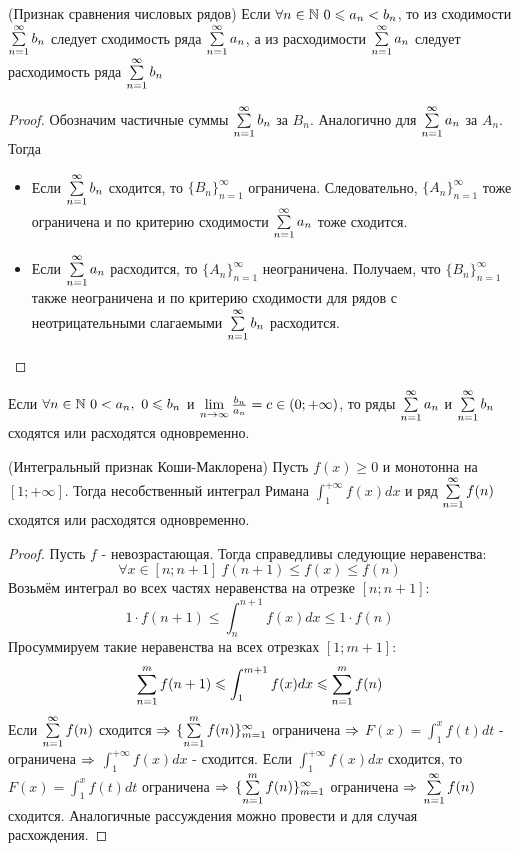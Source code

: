 \begin{theorem} (Признак сравнения числовых рядов)
	Если $\forall n \in \mathbb{N}\ 0 \leqslant a_n < b_n$, то из сходимости $\sum\limits_{n = 1}^\infty b_n$ следует сходимость ряда $\sum\limits_{n = 1}^{\infty} a_n$, а из расходимости $\sum\limits_{n = 1}^\infty a_n$ следует расходимость ряда $\sum\limits_{n = 1}^\infty b_n$
\end{theorem}

\begin{proof}
	Обозначим частичные суммы $\sum\limits_{n = 1}^\infty b_n$ за $B_n$. Аналогично для $\sum\limits_{n = 1}^\infty a_n$ за $A_n$. Тогда
	\begin{itemize}
		\item Если $\sum\limits_{n = 1}^\infty b_n$ сходится, то $\{B_n\}_{n = 1}^\infty$ ограничена. Следовательно, $\{A_n\}_{n = 1}^\infty$ тоже ограничена и по критерию сходимости $\sum\limits_{n = 1}^\infty a_n$ тоже сходится.
		
		\item Если $\sum\limits_{n = 1}^\infty a_n$ расходится, то $\{A_n\}_{n = 1}^\infty$ неограничена. Получаем, что $\{B_n\}_{n = 1}^\infty$ также неограничена и по критерию сходимости для рядов с неотрицательными слагаемыми $\sum\limits_{n = 1}^\infty b_n$  расходится.
	\end{itemize}
\end{proof}

\begin{corollary}
	Если $\forall n \in \mathbb{N}\ 0 < a_n,\ 0 \leqslant b_n$ и $\lim\limits_{n \to \infty} \frac{b_n}{a_n} = c \in (0; +\infty)$, то ряды $\sum\limits_{n = 1}^\infty a_n$ и $\sum\limits_{n = 1}^\infty b_n$ сходятся или расходятся одновременно.
\end{corollary}

\begin{theorem} (Интегральный признак Коши-Маклорена)
	Пусть $f(x) \ge 0$ и монотонна на $[1; +\infty]$. Тогда несобственный интеграл Римана $\int_1^{+\infty} f(x) dx$ и ряд $\sum\limits_{n = 1}^\infty f(n)$ сходятся или расходятся одновременно.
\end{theorem}

\begin{proof}
	Пусть $f$ - невозрастающая. Тогда справедливы следующие неравенства:
	\[
		\forall x \in [n; n + 1]\ f(n + 1) \le f(x) \le f(n)
	\]
	Возьмём интеграл во всех частях неравенства на отрезке $[n; n + 1]$:
	\[
		1 \cdot f(n + 1) \le \int_n^{n + 1} f(x) dx \le 1 \cdot f(n)
	\]
	Просуммируем такие неравенства на всех отрезках $[1; m + 1]$:
	\[
		\sum\limits_{n = 1}^m f(n + 1) \leqslant \int_1^{m + 1} f(x) dx \leqslant \sum\limits_{n = 1}^m f(n)
	\]
	Если $\sum\limits_{n = 1}^\infty f(n)$ сходится $\Rightarrow$ $\{\sum\limits_{n = 1}^m f(n)\}_{m = 1}^\infty$ ограничена $\Rightarrow$ $F(x) = \int_1^x f(t) dt$ - ограничена $\Rightarrow$ $\int_1^{+\infty} f(x) dx$ - сходится.
	Если $\int_1^{+\infty} f(x)dx$ сходится, то $F(x) = \int_1^x f(t)dt$ ограничена $\Rightarrow$ $\{\sum\limits_{n = 1}^m f(n)\}_{m = 1}^\infty$  ограничена  $\Rightarrow$ $\sum\limits_{n = 1}^\infty f(n)$ сходится. Аналогичные рассуждения можно провести и для случая расхождения.
\end{proof}

